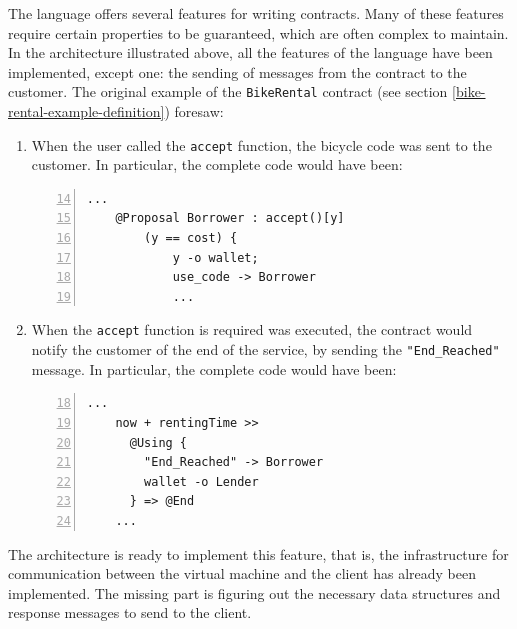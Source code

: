 The language offers several features for writing contracts. Many of these features require certain 
properties to be guaranteed, which are often complex to maintain. In the architecture illustrated above, all 
the features of the language have been implemented, except one: the sending of messages from the contract to 
the customer. The original example of the \verb|BikeRental| contract (see section 
\ref{bike-rental-example-definition}) foresaw:
\begin{enumerate}
  \item When the user called the \verb|accept| function, the bicycle code was sent to the customer. In 
  particular, the complete code would have been:
  \label{send-use-code}
  \begin{Verbatim}[numbers=left,xleftmargin=2cm,firstnumber=14]
    ...
    @Proposal Borrower : accept()[y]
        (y == cost) {
            y -o wallet;
            use_code -> Borrower
            ...
  \end{Verbatim}
  \item When the \verb|accept| function is required was executed, the contract would notify the customer of 
  the end of the service, by sending the \verb|"End_Reached"| message. In particular, the complete code 
  would have been:
  \label{trigger-event-with-message}
  \begin{Verbatim}[numbers=left,xleftmargin=2cm,firstnumber=18]
    ...
    now + rentingTime >>
      @Using {
        "End_Reached" -> Borrower
        wallet -o Lender
      } => @End
    ...
  \end{Verbatim}
\end{enumerate}

The architecture is ready to implement this feature, that is, the infrastructure for communication between 
the virtual machine and the client has already been implemented. The missing part is figuring out the 
necessary data structures and response messages to send to the client.

